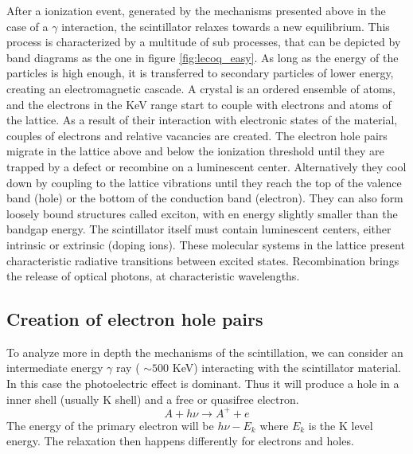 After a ionization event, generated by the mechanisms presented above in the case of a $\gamma$ interaction, the scintillator relaxes towards a new equilibrium. This process is characterized by a multitude of sub processes, that can be depicted by band diagrams as the one in figure \ref{fig:lecoq_easy}.
As long as the energy of the particles is high enough, it is transferred to secondary particles of lower energy, creating an electromagnetic cascade.
A crystal is an ordered ensemble of atoms, and the electrons in the KeV range start to couple with electrons and atoms of the lattice. As a result of their interaction with electronic states of the material, couples of electrons and relative vacancies are created. The electron hole pairs migrate in the lattice above and below the ionization threshold until they are trapped by a defect or recombine on a luminescent center. Alternatively they cool down by coupling to the lattice vibrations until they reach the top of the valence band (hole) or the bottom of the conduction band (electron). They can also form loosely bound structures called exciton, with en energy slightly smaller than the bandgap energy.
The scintillator itself must contain luminescent centers, either intrinsic or extrinsic (doping ions). These molecular systems in the lattice present characteristic radiative transitions between excited states.
Recombination brings the release of optical photons, at characteristic wavelengths.
%
%

\subsection{Creation of electron hole pairs}

To analyze more in depth the mechanisms of the scintillation, we can consider an intermediate energy $\gamma$ ray ( $\sim 500$ KeV) interacting with the scintillator material. In this case the photoelectric effect is dominant. Thus it will produce a hole in a inner shell (usually K shell) and a free or quasifree electron.
\begin{equation}
A + h\nu \rightarrow A^{+} + e
\end{equation}
The energy of the primary electron will be $h\nu - E_{k}$ where $E_{k}$ is the K level energy. The relaxation then happens differently for electrons and holes. 

